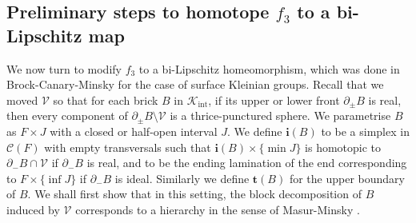 \documentclass{amsart}
\theoremstyle{definition}
\numberwithin{figure}{section}
\numberwithin{equation}{section}
\newcommand{\blackboard}[1]{\ensuremath{\mathbb{#1}}}
\newcommand{\complexes}{\blackboard{C}}
\def\cc{\complexes}
\def\cc{\mathcal{C}}
\def\cv{\mathcal{V}}
\begin{document}
\subsection{Preliminary steps to homotope $f_3$ to a bi-Lipschitz map}
We now turn to modify $f_3$ to a bi-Lipschitz homeomorphism, which was done in Brock-Canary-Minsky \cite{bcm} for the case of surface Kleinian groups.
Recall that we moved $\cv$ so that for each brick $B$ in $\mathcal{K}_\mathrm{int}$,  if its upper or lower front $\partial_\pm B$ is real, then every component of $\partial_\pm B \setminus \cv$ is a thrice-punctured sphere.
We parametrise $B$ as $F \times J$ with a closed or half-open interval $J$.
We define $\boldsymbol{i}(B)$ to be a simplex in $\cc(F)$ with empty transversals such that $\boldsymbol{i}(B) \times \{\min J\}$ is homotopic to $\partial_- B \cap \cv$ if $\partial_-B$ is real, and to be the ending lamination of the end corresponding to $F \times \{\inf J\}$ if $\partial_-B$ is ideal.
Similarly we define  $\boldsymbol{t}(B)$ for the upper boundary of $B$.
We shall first show that  in this setting, the block decomposition of $B$ induced by $\cv$ corresponds to a hierarchy in the sense of Masur-Minsky \cite{mm2}.
\end{document}
